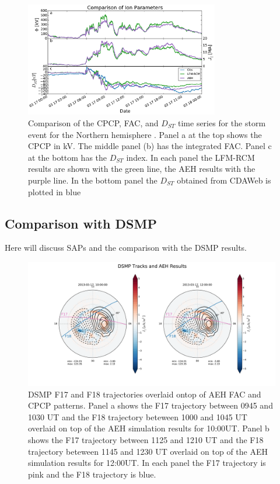 \documentclass[draft,jgrga]{agutex}
\begin{document}
\begin{article}
\begin{figure}
\noindent\includegraphics[width=20pc]{JGRPaper-IonFig.pdf}
\caption{\label{ts-fig} 
Comparison of the CPCP, FAC, and $D_{ST}$ time series for the storm event for the Northern hemisphere .  Panel a at the top shows the CPCP in kV.  The middle panel (b) has the integrated  FAC.  Panel c at the bottom has the $D_{ST}$ index.  In each panel the LFM-RCM results are shown with the green line, the AEH results with the purple line.  In the bottom panel the $D_{ST}$ obtained from CDAWeb is plotted in blue} 
\end{figure}

 \subsection{Comparison with DSMP}
 Here will discuss SAPs and the comparison with the DSMP results.
 
 \begin{figure}[t]
\noindent\includegraphics[width=39pc]{DMSPTraj.pdf}
\caption{\label{dmsptraj-fig}
DSMP F17 and F18 trajectories overlaid ontop of AEH FAC and CPCP patterns.  Panel a shows the F17 trajectory between 0945 and 1030 UT and the F18 trajectory beteween 1000 and 1045 UT overlaid on top of the AEH simulation results for 10:00UT.   Panel b shows the F17 trajectory between 1125 and 1210 UT and the F18 trajectory beteween 1145 and 1230 UT overlaid on top of the AEH simulation results for 12:00UT.  In each panel the F17 trajectory is pink and the F18 trajectory is blue.}
\end{figure}


\end{article}
\end{document}
